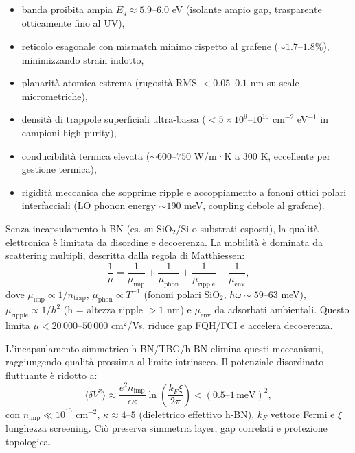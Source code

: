 \documentclass[11pt,a4paper]{article}
\theoremstyle{plain}
\theoremstyle{definition}
\begin{document}
\begin{itemize}
    \item banda proibita ampia $E_g \approx 5.9$--$6.0$ eV (isolante ampio gap, trasparente otticamente fino al UV),
    \item reticolo esagonale con mismatch minimo rispetto al grafene ($\sim 1.7$--$1.8\%$), minimizzando strain indotto,
    \item planarità atomica estrema (rugosità RMS $< 0.05$--$0.1$ nm su scale micrometriche),
    \item densità di trappole superficiali ultra-bassa ($< 5 \times 10^9$--$10^{10}$ cm$^{-2}$ eV$^{-1}$ in campioni high-purity),
    \item conducibilità termica elevata ($\sim 600$--$750$ W/m·K a 300 K, eccellente per gestione termica),
    \item rigidità meccanica che sopprime ripple e accoppiamento a fononi ottici polari interfacciali (LO phonon energy $\sim 190$ meV, coupling debole al grafene).
\end{itemize}

Senza incapsulamento h-BN (es. su SiO$_2$/Si o substrati esposti), la qualità elettronica è limitata da disordine e decoerenza. La mobilità è dominata da scattering multipli, descritta dalla regola di Matthiessen:
\begin{equation}
\frac{1}{\mu} = \frac{1}{\mu_{\text{imp}}} + \frac{1}{\mu_{\text{phon}}} + \frac{1}{\mu_{\text{ripple}}} + \frac{1}{\mu_{\text{env}}},
\end{equation}
dove $\mu_{\text{imp}} \propto 1/n_{\text{trap}}$, $\mu_{\text{phon}} \propto T^{-1}$ (fononi polari SiO$_2$, $\hbar\omega \sim 59$--$63$ meV), $\mu_{\text{ripple}} \propto 1/h^2$ (h = altezza ripple $>1$ nm) e $\mu_{\text{env}}$ da adsorbati ambientali. Questo limita $\mu < 20\,000$--$50\,000$ cm$^2$/Vs, riduce gap FQH/FCI e accelera decoerenza.

L'incapsulamento simmetrico h-BN/TBG/h-BN elimina questi meccanismi, raggiungendo qualità prossima al limite intrinseco. Il potenziale disordinato fluttuante è ridotto a:
\begin{equation}
\langle \delta V^2 \rangle \approx \frac{e^2 n_{\text{imp}}}{\epsilon \kappa} \ln \left( \frac{k_F \xi}{2\pi} \right) < (0.5\text{--}1\,\text{meV})^2,
\end{equation}
con $n_{\text{imp}} \ll 10^{10}$ cm$^{-2}$, $\kappa \approx 4$--$5$ (dielettrico effettivo h-BN), $k_F$ vettore Fermi e $\xi$ lunghezza screening. Ciò preserva simmetria layer, gap correlati e protezione topologica.
\end{document}
